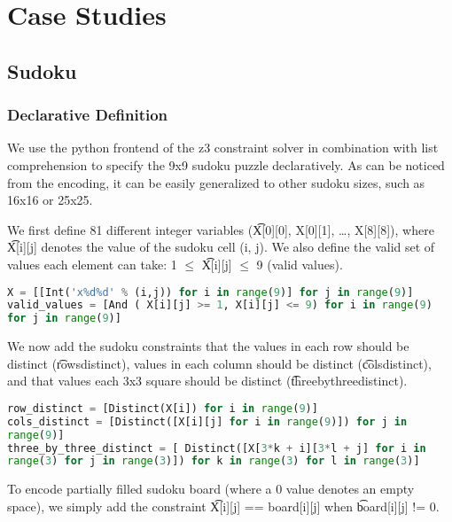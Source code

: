 \section{Case Studies}

\subsection{Sudoku}

\subsubsection{Declarative Definition}
We use the python frontend of the z3 constraint solver in combination with list comprehension to specify the 9x9
sudoku puzzle declaratively. As can be noticed from the encoding, it
can be easily generalized to other sudoku sizes, such as 16x16 or
25x25.

We first define 81 different integer variables (\t{X[0][0], X[0][1], \ldots,
X[8][8]}), where \t{X[i][j]} denotes the value of the sudoku cell (i, j). We
also define the valid set of values each element can take: 1 $\leq$
\t{X[i][j]} $\leq$ 9 (valid values).

\singlespace
\begin{lstlisting}[language=python, frame = single]
X = [[Int('x%d%d' % (i,j)) for i in range(9)] for j in range(9)]
valid_values = [And ( X[i][j] >= 1, X[i][j] <= 9) for i in range(9)
for j in range(9)]
\end{lstlisting}
\doublespace

We now add the sudoku constraints that the values in each row should be
distinct (\t{rows\textunderscore distinct}), values in each column should be distinct
(\t{cols\textunderscore distinct}), and that values each 3x3 square should be distinct
(\t{three\textunderscore by\textunderscore three\textunderscore distinct}).

\singlespace
\begin{lstlisting}[language=python, frame = single]
row_distinct = [Distinct(X[i]) for i in range(9)]
cols_distinct = [Distinct([X[i][j] for i in range(9)]) for j in
range(9)] 
three_by_three_distinct = [ Distinct([X[3*k + i][3*l + j] for i in
range(3) for j in range(3)]) for k in range(3) for l in range(3)]

\end{lstlisting}
\doublespace

To encode partially filled sudoku board (where a 0 value denotes an
empty space), we simply add the constraint \t{X[i][j] == board[i][j]} when
\t{board[i][j]} != 0. 


